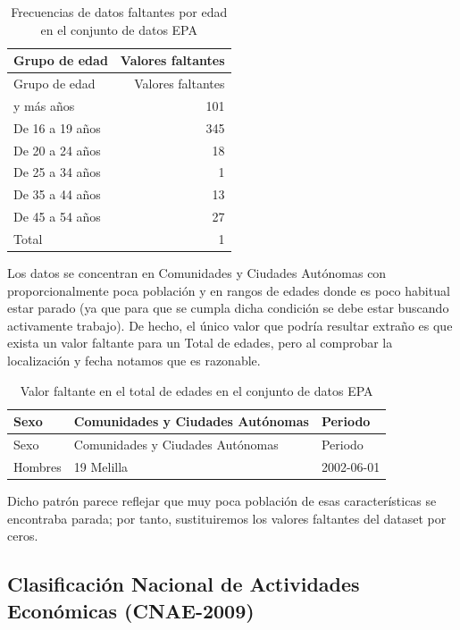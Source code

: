 \documentclass[Universitat de
València,article,submit,moreauthors,pdftex]{Definitions/mdpi}
\begin{document}
\begin{longtable}[]{@{}lr@{}}
\caption{Frecuencias de datos faltantes por edad en el conjunto de datos
EPA}\tabularnewline
\toprule\noalign{}
Grupo de edad & Valores faltantes \\
\midrule\noalign{}
\endfirsthead
\toprule\noalign{}
Grupo de edad & Valores faltantes \\
\midrule\noalign{}
\endhead
\bottomrule\noalign{}
\endlastfoot
55 y más años & 101 \\
De 16 a 19 años & 345 \\
De 20 a 24 años & 18 \\
De 25 a 34 años & 1 \\
De 35 a 44 años & 13 \\
De 45 a 54 años & 27 \\
Total & 1 \\
\end{longtable}

Los datos se concentran en Comunidades y Ciudades Autónomas con
proporcionalmente poca población y en rangos de edades donde es poco
habitual estar parado (ya que para que se cumpla dicha condición se debe
estar buscando activamente trabajo). De hecho, el único valor que podría
resultar extraño es que exista un valor faltante para un Total de
edades, pero al comprobar la localización y fecha notamos que es
razonable.

\begin{longtable}[]{@{}lll@{}}
\caption{Valor faltante en el total de edades en el conjunto de datos
EPA}\tabularnewline
\toprule\noalign{}
Sexo & Comunidades y Ciudades Autónomas & Periodo \\
\midrule\noalign{}
\endfirsthead
\toprule\noalign{}
Sexo & Comunidades y Ciudades Autónomas & Periodo \\
\midrule\noalign{}
\endhead
\bottomrule\noalign{}
\endlastfoot
Hombres & 19 Melilla & 2002-06-01 \\
\end{longtable}

Dicho patrón parece reflejar que muy poca población de esas
características se encontraba parada; por tanto, sustituiremos los
valores faltantes del dataset por ceros.

\subsection{Clasificación Nacional de Actividades Económicas
(CNAE-2009)}\label{clasificaciuxf3n-nacional-de-actividades-econuxf3micas-cnae-2009}
\end{document}
